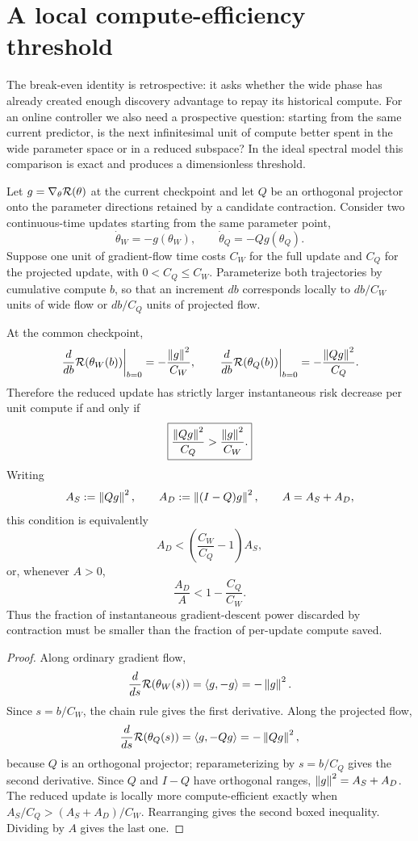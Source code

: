 \section{A local compute-efficiency threshold}
The break-even identity is retrospective: it asks whether the wide phase has already created enough discovery advantage to repay its historical compute. For an online controller we also need a prospective question: starting from the same current predictor, is the next infinitesimal unit of compute better spent in the wide parameter space or in a reduced subspace? In the ideal spectral model this comparison is exact and produces a dimensionless threshold.

Let $g=\nabla_\theta\mathcal R(\theta)$ at the current checkpoint and let $Q$ be an orthogonal projector onto the parameter directions retained by a candidate contraction. Consider two continuous-time updates starting from the same parameter point,
\[
\dot\theta_W=-g(\theta_W),
\qquad
\dot\theta_Q=-Q g(\theta_Q).
\]
Suppose one unit of gradient-flow time costs $C_W$ for the full update and $C_Q$ for the projected update, with $0<C_Q\le C_W$. Parameterize both trajectories by cumulative compute $b$, so that an increment $db$ corresponds locally to $db/C_W$ units of wide flow or $db/C_Q$ units of projected flow.

\begin{theorem}\label{thm:local-compute-efficiency}
At the common checkpoint,
\[
\left.\frac{d}{db}\mathcal R(\theta_W(b))\right|_{b=0}
=-\frac{\left\lVert g\right\rVert^2}{C_W},
\qquad
\left.\frac{d}{db}\mathcal R(\theta_Q(b))\right|_{b=0}
=-\frac{\left\lVert Qg\right\rVert^2}{C_Q}.
\]
Therefore the reduced update has strictly larger instantaneous risk decrease per unit compute if and only if
\[
\boxed{
\frac{\left\lVert Qg\right\rVert^2}{C_Q}
>
\frac{\left\lVert g\right\rVert^2}{C_W}.}
\]
Writing
\[
A_S:=\left\lVert Qg\right\rVert^2,
\qquad
A_D:=\left\lVert (I-Q)g\right\rVert^2,
\qquad
A=A_S+A_D,
\]
this condition is equivalently
\[
\boxed{
A_D
<
\left(\frac{C_W}{C_Q}-1\right)A_S,}
\]
or, whenever $A>0$,
\[
\boxed{
\frac{A_D}{A}
<
1-\frac{C_Q}{C_W}.}
\]
Thus the fraction of instantaneous gradient-descent power discarded by contraction must be smaller than the fraction of per-update compute saved.
\end{theorem}

\begin{proof}
Along ordinary gradient flow,
\[
\frac{d}{ds}\mathcal R(\theta_W(s))
=
\langle g,-g\rangle
=-\left\lVert g\right\rVert^2.
\]
Since $s=b/C_W$, the chain rule gives the first derivative. Along the projected flow,
\[
\frac{d}{ds}\mathcal R(\theta_Q(s))
=
\langle g,-Qg\rangle
=-\left\lVert Qg\right\rVert^2,
\]
because $Q$ is an orthogonal projector; reparameterizing by $s=b/C_Q$ gives the second derivative. Since $Q$ and $I-Q$ have orthogonal ranges,
$\left\lVert g\right\rVert^2=A_S+A_D$. The reduced update is locally more compute-efficient exactly when
$A_S/C_Q>(A_S+A_D)/C_W$. Rearranging gives the second boxed inequality. Dividing by $A$ gives the last one.
\end{proof}

